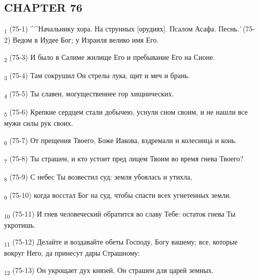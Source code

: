 \subsection{CHAPTER 76}
\begin{tcolorbox}
\textsubscript{1} (75-1) ^^Начальнику хора. На струнных [орудиях]. Псалом Асафа. Песнь.^^ (75-2) Ведом в Иудее Бог; у Израиля велико имя Его.
\end{tcolorbox}
\begin{tcolorbox}
\textsubscript{2} (75-3) И было в Салиме жилище Его и пребывание Его на Сионе.
\end{tcolorbox}
\begin{tcolorbox}
\textsubscript{3} (75-4) Там сокрушил Он стрелы лука, щит и меч и брань.
\end{tcolorbox}
\begin{tcolorbox}
\textsubscript{4} (75-5) Ты славен, могущественнее гор хищнических.
\end{tcolorbox}
\begin{tcolorbox}
\textsubscript{5} (75-6) Крепкие сердцем стали добычею, уснули сном своим, и не нашли все мужи силы рук своих.
\end{tcolorbox}
\begin{tcolorbox}
\textsubscript{6} (75-7) От прещения Твоего, Боже Иакова, вздремали и колесница и конь.
\end{tcolorbox}
\begin{tcolorbox}
\textsubscript{7} (75-8) Ты страшен, и кто устоит пред лицем Твоим во время гнева Твоего?
\end{tcolorbox}
\begin{tcolorbox}
\textsubscript{8} (75-9) С небес Ты возвестил суд; земля убоялась и утихла,
\end{tcolorbox}
\begin{tcolorbox}
\textsubscript{9} (75-10) когда восстал Бог на суд, чтобы спасти всех угнетенных земли.
\end{tcolorbox}
\begin{tcolorbox}
\textsubscript{10} (75-11) И гнев человеческий обратится во славу Тебе: остаток гнева Ты укротишь.
\end{tcolorbox}
\begin{tcolorbox}
\textsubscript{11} (75-12) Делайте и воздавайте обеты Господу, Богу вашему; все, которые вокруг Него, да принесут дары Страшному:
\end{tcolorbox}
\begin{tcolorbox}
\textsubscript{12} (75-13) Он укрощает дух князей, Он страшен для царей земных.
\end{tcolorbox}
